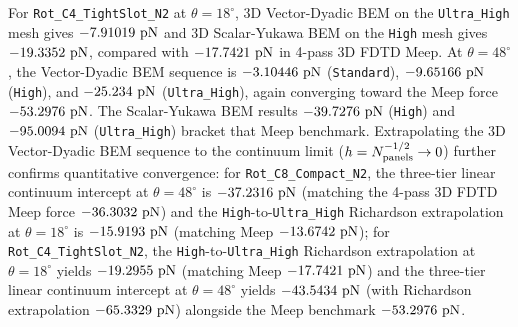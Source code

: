\documentclass[11pt,letterpaper]{article}
\begin{document}
For \texttt{Rot\_C4\_TightSlot\_N2} at $\theta=18^\circ$, 3D Vector-Dyadic BEM on the \texttt{Ultra\_High} mesh gives $-7.91019{}\text{ pN}$ and 3D Scalar-Yukawa BEM on the \texttt{High} mesh gives $-19.3352{}\text{ pN}$, compared with $-17.7421{}\text{ pN}$ in 4-pass 3D FDTD Meep. At $\theta=48^\circ$, the Vector-Dyadic BEM sequence is $-3.10446{}\text{ pN}$ (\texttt{Standard}), $-9.65166{}\text{ pN}$ (\texttt{High}), and $-25.234{}\text{ pN}$ (\texttt{Ultra\_High}), again converging toward the Meep force $-53.2976{}\text{ pN}$. The Scalar-Yukawa BEM results $-39.7276{}\text{ pN}$ (\texttt{High}) and $-95.0094{}\text{ pN}$ (\texttt{Ultra\_High}) bracket that Meep benchmark. Extrapolating the 3D Vector-Dyadic BEM sequence to the continuum limit ($h = N_{\rm panels}^{-1/2} \to 0$) further confirms quantitative convergence: for \texttt{Rot\_C8\_Compact\_N2}, the three-tier linear continuum intercept at $\theta=48^\circ$ is $-37.2316{}\text{ pN}$ (matching the 4-pass 3D FDTD Meep force $-36.3032{}\text{ pN}$) and the \texttt{High}-to-\texttt{Ultra\_High} Richardson extrapolation at $\theta=18^\circ$ is $-15.9193{}\text{ pN}$ (matching Meep $-13.6742{}\text{ pN}$); for \texttt{Rot\_C4\_TightSlot\_N2}, the \texttt{High}-to-\texttt{Ultra\_High} Richardson extrapolation at $\theta=18^\circ$ yields $-19.2955{}\text{ pN}$ (matching Meep $-17.7421{}\text{ pN}$) and the three-tier linear continuum intercept at $\theta=48^\circ$ yields $-43.5434{}\text{ pN}$ (with Richardson extrapolation $-65.3329{}\text{ pN}$) alongside the Meep benchmark $-53.2976{}\text{ pN}$.
\end{document}
